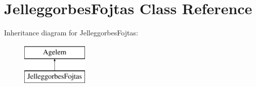 \hypertarget{class_jelleggorbes_fojtas}{}\section{Jelleggorbes\+Fojtas Class Reference}
\label{class_jelleggorbes_fojtas}
Inheritance diagram for Jelleggorbes\+Fojtas\+:\begin{figure}[H]
\begin{center}
\leavevmode
\includegraphics[height=2.000000cm]{class_jelleggorbes_fojtas}
\end{center}
\end{figure}
